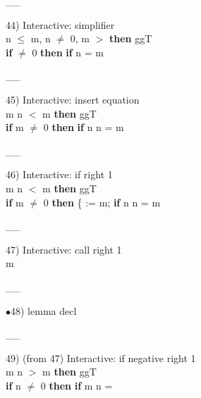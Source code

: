 \documentclass[a4paper]{article}
\begin{document}
\vspace{-1.5ex}\_\hrulefill \_

44) Interactive: simplifier \\
\tabf n $\le$ m, n $\neq$ 0, m %
\Fol {}  $>$  {\bf then} ggT \\
 \tabf {} {\bf if}  $\neq$ 0 {\bf then} {\bf if}  %
n = m

\vspace{-1.5ex}\_\hrulefill \_

45) Interactive: insert equation \\
\tabf m %
\Fol {} n $<$ m {\bf then} ggT \\
 \tabf {} {\bf if} m $\neq$ 0 {\bf then} {\bf if} n %
n = m

\vspace{-1.5ex}\_\hrulefill \_

46) Interactive: if right  1\\
\tabf m %
\Fol {} n $<$ m {\bf then} ggT \\
 \tabf {} {\bf if} m $\neq$ 0 {\bf then} \{ := m; {\bf if} n %
n = m

\vspace{-1.5ex}\_\hrulefill \_

47) Interactive: call right  1\\
m %

\vspace{-1.5ex}\_\hrulefill \_

$\bullet$48) lemma decl \\
 \Fol 

\vspace{-1.5ex}\_\hrulefill \_

49)  (from 47) Interactive: if negative right  1\\
\tabf m %
\Fol {} n $>$ m {\bf then} ggT \\
 \tabf {} {\bf if} n $\neq$ 0 {\bf then} {\bf if} m %
n = 
\end{document}
